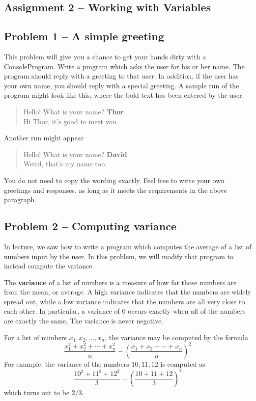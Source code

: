 \documentclass[11pt]{article}
\theoremstyle{plain}
\theoremstyle{definition}
\theoremstyle{remark}
\newcommand{\paren}[1]{{\left({#1}\right)}}
\begin{document}
\begin{center}
\section*{Assignment 2 -- Working with Variables}
\end{center}
\subsection*{Problem 1 -- A simple greeting}
This problem will give you a chance to get your hands dirty with a
ConsoleProgram. Write a program which asks the user for his or her name. The
program should reply with a greeting to that user. In addition, if the user has
your own name, you should reply with a special greeting. A sample run of the
program might look like this, where the bold text has been entered by the user.
\begin{quote}
  Hello! What is your name? \textbf{Thor}\\
  Hi Thor, it's good to meet you.
\end{quote}
Another run might appear
\begin{quote}
  Hello! What is your name? \textbf{David}\\
  Weird, that's my name too.
\end{quote}
You do not need to copy the wording exactly. Feel free to write your own
greetings and responses, as long as it meets the requirements in the above
paragraph.
\subsection*{Problem 2 -- Computing variance}
In lecture, we saw how to write a program which computes the average of a list
of numbers input by the user. In this problem, we will modify that program to
instead compute the variance.

The \textbf{variance} of a list of numbers is a measure of how far those numbers
are from the mean, or average. A high variance indicates that the numbers are
widely spread out, while a low variance indicates that the numbers are all very
close to each other. In particular, a variance of $0$ occurs exactly when all of
the numbers are exactly the same, The variance is never negative.

For a list of numbers $x_1, x_2, \ldots, x_n$, the variance may be
computed by the formula
\[
\frac{x_1^2 + x_2^2 + \cdots + x_n^2}{n} - \paren{\frac{x_1 + x_2 + \cdots
+ x_n}{n}}^2
\]
For example, the variance of the numbers $10, 11, 12$ is computed as
\[
\frac{10^2 + 11^2 + 12^2}{3} - \paren{\frac{10 + 11 + 12}{3}}^2
\]
which turns out to be $2/3$.
\end{document}
